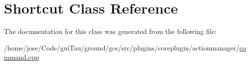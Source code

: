 \hypertarget{class_shortcut}{\section{Shortcut Class Reference}
\label{class_shortcut}
}


The documentation for this class was generated from the following file\-:\begin{DoxyCompactItemize}
\item 
/home/jose/\-Code/gui\-Tau/ground/gcs/src/plugins/coreplugin/actionmanager/\hyperlink{command_8cpp}{command.\-cpp}\end{DoxyCompactItemize}

